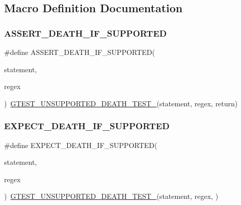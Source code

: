 \subsection{Macro Definition Documentation}
\mbox{\label{gtest-death-test_8h_ab2f0f25b46353767179a49ebd15b7345}} 
\subsubsection{\texorpdfstring{ASSERT\_DEATH\_IF\_SUPPORTED}{ASSERT\_DEATH\_IF\_SUPPORTED}}
{\footnotesize\ttfamily \#define A\+S\+S\+E\+R\+T\+\_\+\+D\+E\+A\+T\+H\+\_\+\+I\+F\+\_\+\+S\+U\+P\+P\+O\+R\+T\+ED(\begin{DoxyParamCaption}\item[{}]{statement,  }\item[{}]{regex }\end{DoxyParamCaption})~\mbox{\hyperlink{gtest-death-test-internal_8h_a29a145cda8bd2d0c6a78b0ac1d670d18}{G\+T\+E\+S\+T\+\_\+\+U\+N\+S\+U\+P\+P\+O\+R\+T\+E\+D\+\_\+\+D\+E\+A\+T\+H\+\_\+\+T\+E\+S\+T\+\_\+}}(statement, regex, return)}

\mbox{\label{gtest-death-test_8h_a8564de0e012dd0898949c513d1571f8b}} 
\subsubsection{\texorpdfstring{EXPECT\_DEATH\_IF\_SUPPORTED}{EXPECT\_DEATH\_IF\_SUPPORTED}}
{\footnotesize\ttfamily \#define E\+X\+P\+E\+C\+T\+\_\+\+D\+E\+A\+T\+H\+\_\+\+I\+F\+\_\+\+S\+U\+P\+P\+O\+R\+T\+ED(\begin{DoxyParamCaption}\item[{}]{statement,  }\item[{}]{regex }\end{DoxyParamCaption})~\mbox{\hyperlink{gtest-death-test-internal_8h_a29a145cda8bd2d0c6a78b0ac1d670d18}{G\+T\+E\+S\+T\+\_\+\+U\+N\+S\+U\+P\+P\+O\+R\+T\+E\+D\+\_\+\+D\+E\+A\+T\+H\+\_\+\+T\+E\+S\+T\+\_\+}}(statement, regex, )}

